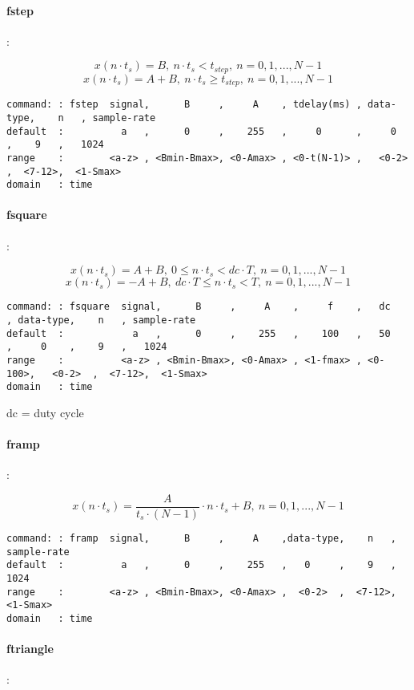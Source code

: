 \documentclass{report}
\newcommand{\bc}{\scriptsize}
\newcommand{\ec}{\normalsize}
\begin{document}
\paragraph{fstep}:

\[ x(n \cdot t_{s}) = B,~ n \cdot t_{s} < t_{step},~ n=0,1,...,N-1 \]
\[ x(n \cdot t_{s}) = A+B,~ n \cdot t_{s} \geq t_{step},~ n=0,1,...,N-1 \]

\bc
\begin{verbatim}
command: : fstep  signal,      B     ,     A    , tdelay(ms) , data-type,    n   , sample-rate
default  :          a   ,      0     ,    255   ,     0      ,     0    ,    9   ,   1024
range    :        <a-z> , <Bmin-Bmax>, <0-Amax> , <0-t(N-1)> ,   <0-2>  ,  <7-12>,  <1-Smax>
domain   : time
\end{verbatim}
\ec

\paragraph{fsquare}:

\[ x(n \cdot t_{s}) = A+B,~ 0 \leq n \cdot t_{s} < dc \cdot T,~ n=0,1,...,N-1 \]
\[ x(n \cdot t_{s}) = -A+B,~ dc \cdot T \leq n \cdot t_{s} < T,~ n=0,1,...,N-1 \]

\bc
\begin{verbatim}
command: : fsquare  signal,      B     ,     A    ,     f    ,   dc   , data-type,    n   , sample-rate
default  :            a   ,      0     ,    255   ,    100   ,   50   ,     0    ,    9   ,   1024
range    :          <a-z> , <Bmin-Bmax>, <0-Amax> , <1-fmax> , <0-100>,   <0-2>  ,  <7-12>,  <1-Smax>
domain   : time
\end{verbatim}
\ec

dc = duty cycle

\paragraph{framp}:

\[ x(n \cdot t_{s}) = \frac{A}{t_{s} \cdot (N-1)} \cdot n \cdot t_{s} + B,~ n=0,1,...,N-1 \]

\bc
\begin{verbatim}
command: : framp  signal,      B     ,     A    ,data-type,    n   , sample-rate
default  :          a   ,      0     ,    255   ,   0     ,    9   ,   1024
range    :        <a-z> , <Bmin-Bmax>, <0-Amax> ,  <0-2>  ,  <7-12>,  <1-Smax>
domain   : time
\end{verbatim}
\ec

\paragraph{ftriangle}:
\end{document}
